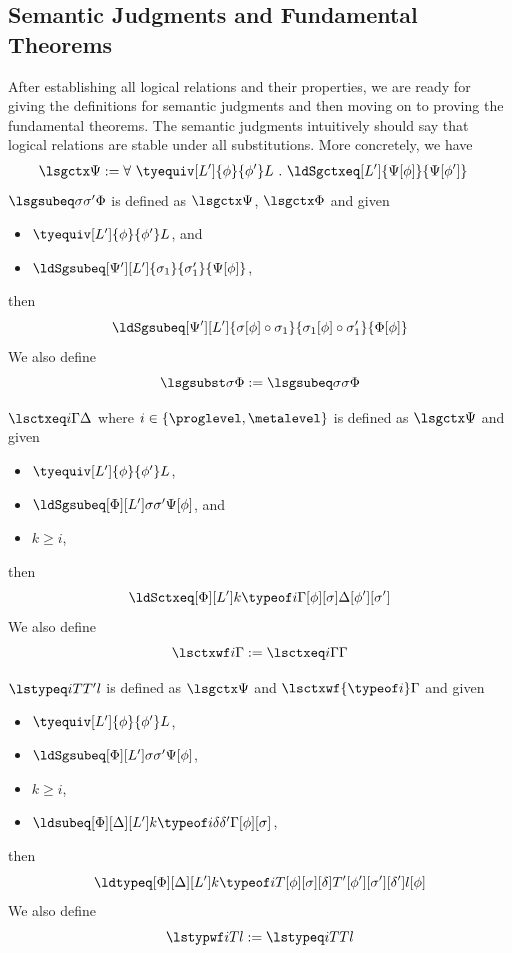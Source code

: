 \subsection{Semantic Judgments and Fundamental Theorems}

After establishing all logical relations and their properties, we are ready for giving
the definitions for semantic judgments and then moving on to proving the fundamental
theorems. %
The semantic judgments intuitively should say that logical relations are stable under
all substitutions. %
More concretely, we have
\begin{align*}
  \lsgctx \Psi &:= \forall ~ \tyequiv[L']{\phi}{\phi'}L ~.~
                 \ldSgctxeq[L']{\Psi[\phi]}{\Psi[\phi']}
\end{align*}
$\lsgsubeq \sigma{\sigma'} \Phi$ is defined as $\lsgctx \Psi$, $\lsgctx \Phi$ and
given
\begin{itemize}
\item $\tyequiv[L']{\phi}{\phi'}L$, and
\item $\ldSgsubeq[\Psi'][L']{\sigma_1}{\sigma_1'}{\Psi[\phi]}$, 
\end{itemize}
then
\[
  \ldSgsubeq[\Psi'][L']{\sigma[\phi] \circ \sigma_1}{\sigma_1[\phi] \circ \sigma_1'}{\Phi[\phi]}
\]
We also define
\[
  \lsgsubst \sigma \Phi := \lsgsubeq \sigma\sigma \Phi
\]

$\lsctxeq i \Gamma{\Delta}$ where $i \in \{\proglevel, \metalevel \}$ is defined as $\lsgctx \Psi$ and given
\begin{itemize}
\item $\tyequiv[L']{\phi}{\phi'}L$, 
\item $\ldSgsubeq[\Phi][L'] \sigma{\sigma'}{\Psi[\phi]}$, and 
\item $k \ge i$,
\end{itemize}
then
\[
  \ldSctxeq[\Phi][L'] k{\typeof i} {\Gamma[\phi][\sigma]}{\Delta[\phi'][\sigma']}
\]
We also define
\[
  \lsctxwf i \Gamma := \lsctxeq i \Gamma \Gamma
\]

$\lstypeq i T{T'}l$ is defined as $\lsgctx \Psi$ and $\lsctxwf{\typeof i} \Gamma$ and given
\begin{itemize}
\item $\tyequiv[L']{\phi}{\phi'}L$, 
\item $\ldSgsubeq[\Phi][L'] \sigma{\sigma'}{\Psi[\phi]}$, 
\item $k \ge i$,
\item $\ldsubeq[\Phi][\Delta][L'] k{\typeof i} \delta{\delta'}{\Gamma[\phi][\sigma]}$, 
\end{itemize}
then
\[
  \ldtypeq[\Phi][\Delta][L']k{\typeof i}{T[\phi][\sigma][\delta]}{T'[\phi'][\sigma'][\delta']}{l[\phi]}
\]
We also define
\[
  \lstypwf i T l := \lstypeq i T{T}l
\]

